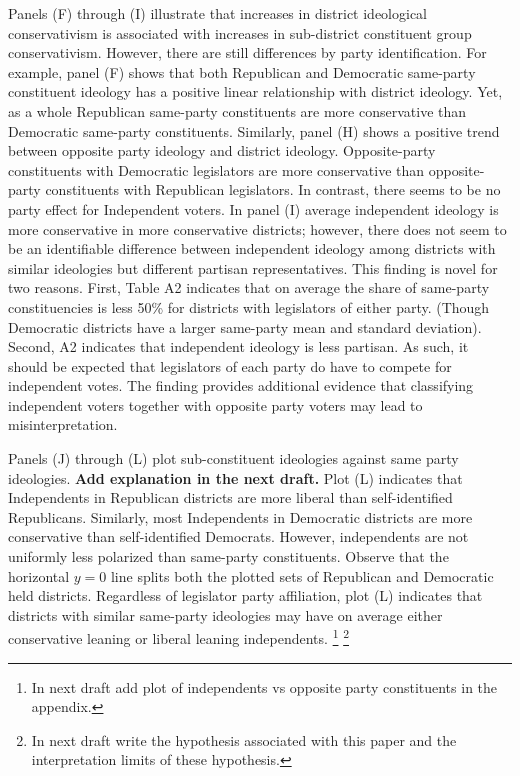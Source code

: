 \documentclass[10pt,letterpaper]{article}
\begin{document}
Panels (F) through (I) illustrate that increases in district ideological conservativism is associated with increases in sub-district constituent group conservativism. However, there are still differences by party identification. For example, panel (F) shows that both Republican and Democratic same-party constituent ideology has a positive linear relationship with district ideology. Yet, as a whole Republican same-party constituents are more conservative than Democratic same-party constituents. Similarly, panel (H) shows a positive trend between opposite party ideology and district ideology. Opposite-party constituents with Democratic legislators are more conservative than opposite-party constituents with Republican legislators. In contrast, there seems to be no party effect for Independent voters. In panel (I) average independent ideology is more conservative in more conservative districts; however, there does not seem to be an identifiable difference between independent ideology among districts with similar ideologies but different partisan representatives. This finding is novel for two reasons. First, Table A2 indicates that on average the share of same-party constituencies is less 50\% for districts with legislators of either party. (Though Democratic districts have a larger same-party mean and standard deviation). Second, A2 indicates that independent ideology is less partisan. As such, it should be expected that legislators of each party do have to compete for independent votes. The finding provides additional evidence that classifying independent voters together with opposite party voters may lead to misinterpretation.

Panels (J) through (L) plot sub-constituent ideologies against same party ideologies. \textbf{Add explanation in the next draft.} Plot (L) indicates that Independents in Republican districts are more liberal than self-identified Republicans. Similarly, most Independents in Democratic districts are more conservative than self-identified Democrats. However, independents are not uniformly less polarized than same-party constituents. Observe  that the horizontal $y=0$ line splits both the plotted sets of Republican and Democratic held districts. Regardless of legislator party affiliation, plot (L) indicates that districts with similar same-party ideologies may have on average either conservative leaning or liberal leaning independents. \footnote{In next draft add plot of independents vs opposite party constituents in the appendix.} \footnote{In next draft write the hypothesis associated with this paper and the interpretation limits of these hypothesis.}
\end{document}
